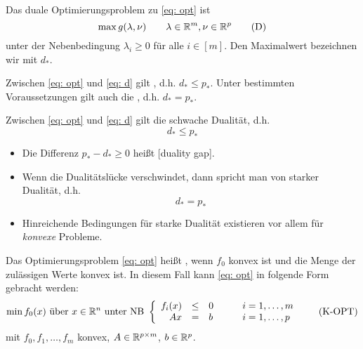 \begin{*definition}
	Das duale Optimierungsproblem zu \eqref{eq: opt} ist
	\begin{equation*}
		\max g(\lambda, \nu) \qquad \lambda \in \mathbb{R}^m, \nu \in \mathbb{R}^p
		\tag{D} \label{eq: d}
	\end{equation*}
	unter der Nebenbedingung $\lambda_i \ge 0$ für alle $i \in [m]$. Den Maximalwert bezeichnen wir mit $d_\ast$.
\end{*definition}

Zwischen \eqref{eq: opt} und \eqref{eq: d} gilt , d.h. $d_\ast \le p_\ast$.
Unter bestimmten Voraussetzungen gilt auch die , d.h. $d_\ast = p_\ast$.

\begin{lemma}
	Zwischen \eqref{eq: opt} und \eqref{eq: d} gilt die schwache Dualität, d.h.
	\begin{equation*}
		d_\ast \le p_\ast
		\tag{WD} \label{eq: wd}
	\end{equation*}
\end{lemma}

\begin{*bemerkung}
	\begin{itemize}[nolistsep]
		\item Die Differenz $p_\ast - d_\ast \ge 0$ heißt  [duality gap].
		\item Wenn die Dualitätslücke verschwindet, dann spricht man von starker Dualität, d.h. 
		\begin{equation*}
			d_\ast = p_\ast
		\end{equation*}
		\item Hinreichende Bedingungen für starke Dualität existieren vor allem für \textit{konvexe} Probleme.
	\end{itemize}
\end{*bemerkung}

\begin{*definition}
	Das Optimierungsproblem \eqref{eq: opt} heißt , wenn $f_0$ konvex ist und die Menge der zulässigen Werte konvex ist. In diesem Fall kann \eqref{eq: opt} in folgende Form gebracht werden:
	\begin{equation*}
	\begin{aligned}
		\min f_0(x) \text{ über } x \in \mathbb{R}^n \text{ 	unter NB }
		\left\{ \begin{array}{rclcl}
		f_i(x) &\le& 0 & \quad & i = 1, \dots, m \\
		Ax &=& b & \quad & i = 1, \dots, p
	\end{array} \right.
	\end{aligned}
		\tag{K-OPT} \label{eq: k-opt}
	\end{equation*}
	mit $f_0, f_1, \dots, f_m$ konvex, $A \in \mathbb{R}^{p \times m}$, $b \in \mathbb{R}^p$.
\end{*definition}

